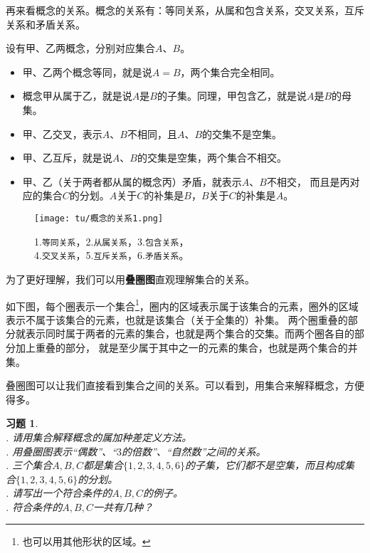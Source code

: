 \documentclass[12pt,UTF8]{ctexbook}
\theoremstyle{definition}
\theoremstyle{plain}
\newtheorem{xt}{习题}[section]
\begin{document}
再来看概念的关系。概念的关系有：等同关系，从属和包含关系，交叉关系，互斥关系和矛盾关系。

设有甲、乙两概念，分别对应集合$A$、$B$。
\begin{itemize}
    \item 甲、乙两个概念等同，就是说$A = B$，两个集合完全相同。
    \item 概念甲从属于乙，就是说$A$是$B$的子集。同理，甲包含乙，就是说$A$是$B$的母集。
    \item 甲、乙交叉，表示$A$、$B$不相同，且$A$、$B$的交集不是空集。
    \item 甲、乙互斥，就是说$A$、$B$的交集是空集，两个集合不相交。
    \item 甲、乙（关于两者都从属的概念丙）矛盾，就表示$A$、$B$不相交，
    而且是丙对应的集合$C$的分划。$A$关于$C$的补集是$B$，$B$关于$C$的补集是$A$。
\end{itemize}

\begin{figure}[h]
    \vspace{4pt}
    \centering
    \texttt{[image: tu/概念的关系1.png]}
    \captionsetup{justification=centering}
    \caption*{1.\texttt{等同关系}，2.\texttt{从属关系}，3.\texttt{包含关系}，\\4.\texttt{交叉关系}，5.\texttt{互斥关系}，6.\texttt{矛盾关系}。}
\end{figure}

为了更好理解，我们可以用\textbf{叠圈图}直观理解集合的关系。

如下图，每个圈表示一个集合\footnote{也可以用其他形状的区域。}，圈内的区域表示属于该集合的元素，圈外的区域表示不属于该集合的元素，也就是该集合（关于全集的）补集。
两个圈重叠的部分就表示同时属于两者的元素的集合，也就是两个集合的交集。而两个圈各自的部分加上重叠的部分，
就是至少属于其中之一的元素的集合，也就是两个集合的并集。

叠圈图可以让我们直接看到集合之间的关系。可以看到，用集合来解释概念，方便得多。

\begin{xt}\label{xt:2-0-20}
    \mbox{} \\ 
    . 请用集合解释概念的属加种差定义方法。\\
    . 用叠圈图表示“偶数”、“$3$的倍数”、“自然数”之间的关系。\\
    . 三个集合$A,B,C$都是集合$\{1,2,3,4,5,6\}$的子集，它们都不是空集，而且构成集合$\{1,2,3,4,5,6\}$的分划。\\
    . 请写出一个符合条件的$A,B,C$的例子。\\
    . 符合条件的$A,B,C$一共有几种？
\end{xt}
\end{document}
